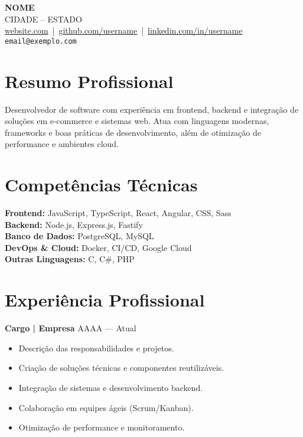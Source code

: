 \documentclass[a4paper,10pt]{article}
\begin{document}
\begin{center}
    {\LARGE \textbf{NOME}}\\[4pt]
    CIDADE – ESTADO \\[2pt]
    \href{https://example.com}{website.com} \,|\, 
    \href{https://github.com/username}{github.com/username} \,|\, 
    \href{https://www.linkedin.com/in/username/}{linkedin.com/in/username}\\[6pt]
    \texttt{email@exemplo.com}
\end{center}

\vspace{0.4cm}

\section*{Resumo Profissional}
Desenvolvedor de software com experiência em frontend, backend e integração de soluções em e-commerce e sistemas web. 
Atua com linguagens modernas, frameworks e boas práticas de desenvolvimento, além de otimização de performance e ambientes cloud.

\section*{Competências Técnicas}
\textbf{Frontend:} JavaScript, TypeScript, React, Angular, CSS, Sass\\
\textbf{Backend:} Node.js, Express.js, Fastify\\
\textbf{Banco de Dados:} PostgreSQL, MySQL\\
\textbf{DevOps \& Cloud:} Docker, CI/CD, Google Cloud\\
\textbf{Outras Linguagens:} C, C\#, PHP

\section*{Experiência Profissional}
\textbf{Cargo | Empresa} \hfill AAAA — Atual\\[-4pt]
\begin{itemize}[leftmargin=1.2em, noitemsep, topsep=3pt]
    \item Descrição das responsabilidades e projetos.
    \item Criação de soluções técnicas e componentes reutilizáveis.
    \item Integração de sistemas e desenvolvimento backend.
    \item Colaboração em equipes ágeis (Scrum/Kanban).
    \item Otimização de performance e monitoramento.
\end{itemize}
\end{document}
